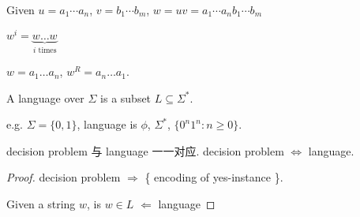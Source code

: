 \begin{definition}[Concatenation]
    Given $u=a_1\cdots a_n$, $v=b_1\cdots b_m$, $w=uv=a_1\cdots a_n b_1 \cdots b_m$
\end{definition}

\begin{definition}[exponentiation(幂)]
    $w^i=\underbrace{w\dots w}_{i \text{ times}}$
\end{definition} 

\begin{definition}[reversal]
    $w=a_1\dots a_n$, $w^R=a_n\dots a_1$. 
\end{definition}

\begin{definition}[Language]
    A language over $\Sigma$ is a subset $L \subseteq  \Sigma^*$. 
\end{definition}

e.g. $\Sigma=\{ 0,1 \}$, language is $\phi$, $\Sigma^*$, $\{ 0^n 1^n : n\ge 0 \}$. 

decision problem 与 language 一一对应. decision problem $\Leftrightarrow$ language. 
\begin{proof}
    decision problem $\Rightarrow$ \{ encoding of yes-instance \}. 

    Given a string $w$, is $w\in L$ $\Leftarrow$ language
\end{proof}